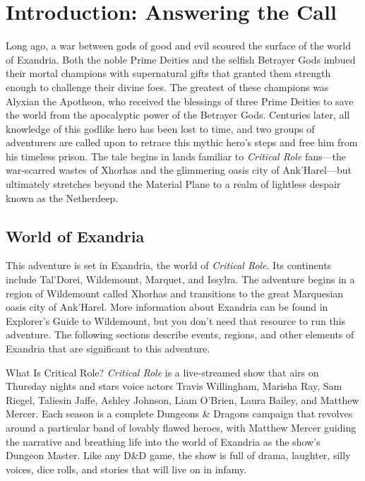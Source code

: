 \documentclass[10pt,a4,twoside,twocolumn,openany,nodeprecatedcode]{dndbook}
\begin{document}
\raggedbottom
\tableofcontents
\newpage
\chapter{Introduction: Answering the Call}
Long ago, a war between gods of good and evil scoured the surface of the world of Exandria. Both the noble Prime Deities and the selfish Betrayer Gods imbued their mortal champions with supernatural gifts that granted them strength enough to challenge their divine foes. The greatest of these champions was Alyxian the Apotheon, who received the blessings of three Prime Deities to save the world from the apocalyptic power of the Betrayer Gods.
Centuries later, all knowledge of this godlike hero has been lost to time, and two groups of adventurers are called upon to retrace this mythic hero's steps and free him from his timeless prison. The tale begins in lands familiar to \textit{Critical Role} fans—the war-scarred wastes of Xhorhas and the glimmering oasis city of Ank'Harel—but ultimately stretches beyond the Material Plane to a realm of lightless despair known as the Netherdeep.
\section{World of Exandria}
This adventure is set in Exandria, the world of \textit{Critical Role}. Its continents include Tal'Dorei, Wildemount, Marquet, and Issylra. The adventure begins in a region of Wildemount called Xhorhas and transitions to the great Marquesian oasis city of Ank'Harel. More information about Exandria can be found in Explorer's Guide to Wildemount, but you don't need that resource to run this adventure.
The following sections describe events, regions, and other elements of Exandria that are significant to this adventure.
\begin{DndComment}{What Is Critical Role?}
\textit{Critical Role} is a live-streamed show that airs on Thursday nights and stars voice actors Travis Willingham, Marisha Ray, Sam Riegel, Taliesin Jaffe, Ashley Johnson, Liam O'Brien, Laura Bailey, and Matthew Mercer. Each season is a complete Dungeons \& Dragons campaign that revolves around a particular band of lovably flawed heroes, with Matthew Mercer guiding the narrative and breathing life into the world of Exandria as the show's Dungeon Master. Like any D\&D game, the show is full of drama, laughter, silly voices, dice rolls, and stories that will live on in infamy.
\end{DndComment}
\end{document}
